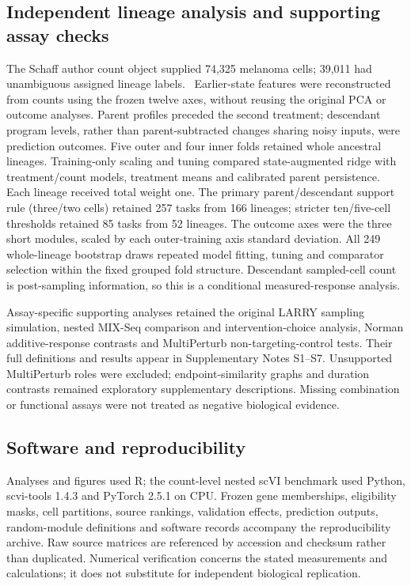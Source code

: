 \documentclass[a4paper,fleqn]{cas-sc}
\makeatletter
\DeclareRobustCommand{\rev}[1]{{\color{red}\def\@citecolor{black}\def\@linkcolor{red}\def\@urlcolor{red}#1}}
\let\unmarkedcite\cite
\renewcommand{\cite}[1]{{\color{black}\def\@citecolor{black}\unmarkedcite{#1}}}
\makeatother
\begin{document}
\subsection{\rev{Independent lineage analysis and supporting assay checks}}

\rev{The Schaff author count object supplied 74,325 melanoma cells; 39,011 had unambiguous assigned lineage labels.~\cite{schaff2024}} \rev{Earlier-state features were reconstructed from counts using the frozen twelve axes, without reusing the original PCA or outcome analyses.} \rev{Parent profiles preceded the second treatment; descendant program levels, rather than parent-subtracted changes sharing noisy inputs, were prediction outcomes.} \rev{Five outer and four inner folds retained whole ancestral lineages.} \rev{Training-only scaling and tuning compared state-augmented ridge with treatment/count models, treatment means and calibrated parent persistence.} \rev{Each lineage received total weight one.} \rev{The primary parent/descendant support rule (three/two cells) retained 257 tasks from 166 lineages; stricter ten/five-cell thresholds retained 85 tasks from 52 lineages.} \rev{The outcome axes were the three short modules, scaled by each outer-training axis standard deviation.} \rev{All 249 whole-lineage bootstrap draws repeated model fitting, tuning and comparator selection within the fixed grouped fold structure.} \rev{Descendant sampled-cell count is post-sampling information, so this is a conditional measured-response analysis.}

\rev{Assay-specific supporting analyses retained the original LARRY sampling simulation, nested MIX-Seq comparison and intervention-choice analysis, Norman additive-response contrasts and MultiPerturb non-targeting-control tests.} \rev{Their full definitions and results appear in Supplementary Notes S1--S7.} \rev{Unsupported MultiPerturb roles were excluded; endpoint-similarity graphs and duration contrasts remained exploratory supplementary descriptions.} \rev{Missing combination or functional assays were not treated as negative biological evidence.}

\subsection{\rev{Software and reproducibility}}

\rev{Analyses and figures used R; the count-level nested scVI benchmark used Python, scvi-tools 1.4.3 and PyTorch 2.5.1 on CPU.} \rev{Frozen gene memberships, eligibility masks, cell partitions, source rankings, validation effects, prediction outputs, random-module definitions and software records accompany the reproducibility archive.} \rev{Raw source matrices are referenced by accession and checksum rather than duplicated.} \rev{Numerical verification concerns the stated measurements and calculations; it does not substitute for independent biological replication.}
\end{document}
